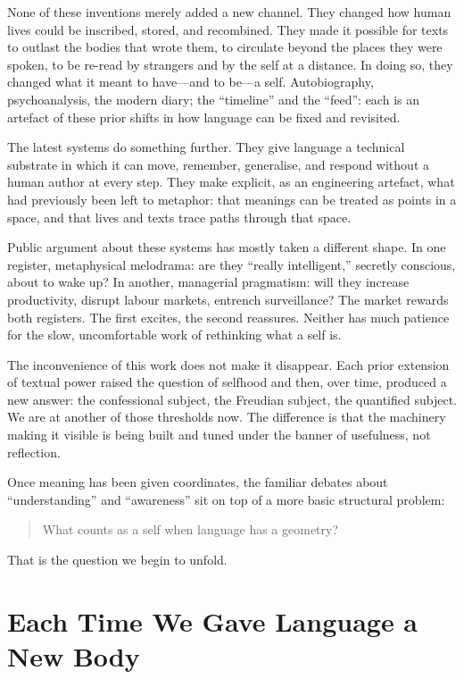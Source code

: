 \documentclass[12pt,a4paper]{report}
\begin{document}
None of these inventions merely added a new channel. They changed how human lives could be inscribed, stored, and recombined. They made it possible for texts to outlast the bodies that wrote them, to circulate beyond the places they were spoken, to be re-read by strangers and by the self at a distance. In doing so, they changed what it meant to have---and to be---a self. Autobiography, psychoanalysis, the modern diary; the ``timeline'' and the ``feed'': each is an artefact of these prior shifts in how language can be fixed and revisited.

The latest systems do something further. They give language a technical substrate in which it can move, remember, generalise, and respond without a human author at every step. They make explicit, as an engineering artefact, what had previously been left to metaphor: that meanings can be treated as points in a space, and that lives and texts trace paths through that space.

Public argument about these systems has mostly taken a different shape. In one register, metaphysical melodrama: are they ``really intelligent,'' secretly conscious, about to wake up? In another, managerial pragmatism: will they increase productivity, disrupt labour markets, entrench surveillance? The market rewards both registers. The first excites, the second reassures. Neither has much patience for the slow, uncomfortable work of rethinking what a self is.

The inconvenience of this work does not make it disappear. Each prior extension of textual power raised the question of selfhood and then, over time, produced a new answer: the confessional subject, the Freudian subject, the quantified subject. We are at another of those thresholds now. The difference is that the machinery making it visible is being built and tuned under the banner of usefulness, not reflection.

Once meaning has been given coordinates, the familiar debates about ``understanding'' and ``awareness'' sit on top of a more basic structural problem:

\begin{quote}
What counts as a self when language has a geometry?
\end{quote}

That is the question we begin to unfold.

\section{Each Time We Gave Language a New Body}
\end{document}
